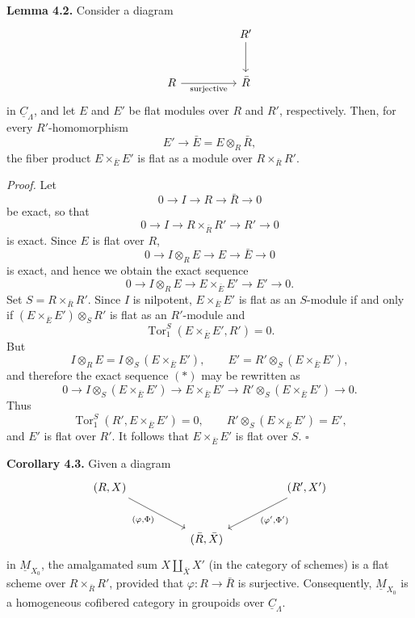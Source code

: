 
\medskip
\noindent\textbf{Lemma 4.2.}
Consider a diagram
\[
\begin{tikzcd}[column sep=huge,row sep=large]
& R' \arrow[d] \\
R \arrow[r,"\mathrm{surjective}"'] & \bar R
\end{tikzcd}
\]
in $\underline C_\Lambda$, and let $E$ and $E'$ be flat modules over
$R$ and $R'$, respectively. Then, for every $R'$-homomorphism
\[
 E'\longrightarrow \bar E=E\otimes_R\bar R,
\]
the fiber product $E\times_{\bar E}E'$ is flat as a module over
$R\times_{\bar R}R'$.


\medskip
\noindent\textit{Proof.}
Let
\[
 0\longrightarrow I\longrightarrow R\longrightarrow\bar R
 \longrightarrow0
\]
be exact, so that
\[
 0\longrightarrow I\longrightarrow R\times_{\bar R}R'
 \longrightarrow R'\longrightarrow0
\]
is exact. Since $E$ is flat over $R$,
\[
 0\longrightarrow I\otimes_RE\longrightarrow E
 \longrightarrow\bar E\longrightarrow0
\]
is exact, and hence we obtain the exact sequence
\begin{equation}\tag{*}
0\longrightarrow I\otimes_RE\longrightarrow
E\times_{\bar E}E'\longrightarrow E'\longrightarrow0.
\end{equation}
Set $S=R\times_{\bar R}R'$. Since $I$ is nilpotent,
$E\times_{\bar E}E'$ is flat as an $S$-module if and only if
$(E\times_{\bar E}E')\otimes_SR'$ is flat as an $R'$-module and
\[
 \operatorname{Tor}_1^S(E\times_{\bar E}E',R')=0.
\]
But
\[
 I\otimes_RE=I\otimes_S(E\times_{\bar E}E'),
 \qquad
 E'=R'\otimes_S(E\times_{\bar E}E'),
\]
and therefore the exact sequence $(*)$ may be rewritten as
\[
0\longrightarrow I\otimes_S(E\times_{\bar E}E')
\longrightarrow E\times_{\bar E}E'
\longrightarrow R'\otimes_S(E\times_{\bar E}E')
\longrightarrow0.
\]
Thus
\[
 \operatorname{Tor}_1^S(R',E\times_{\bar E}E')=0,
 \qquad
 R'\otimes_S(E\times_{\bar E}E')=E',
\]
and $E'$ is flat over $R'$. It follows that
$E\times_{\bar E}E'$ is flat over $S$. \hfill$\square$

\medskip
\noindent\textbf{Corollary 4.3.}
Given a diagram
\[
\begin{tikzcd}[column sep=huge,row sep=large]
(R,X) \arrow[dr,"{(\varphi,\Phi)}"']
&& (R',X') \arrow[dl,"{(\varphi',\Phi')}"] \\
& (\bar R,\bar X) &
\end{tikzcd}
\]
in $\underline M_{X_0}$, the amalgamated sum
$X\amalg_{\bar X}X'$ (in the category of schemes) is a flat scheme
over $R\times_{\bar R}R'$, provided that
$\varphi:R\longrightarrow\bar R$ is surjective. Consequently,
$\underline M_{X_0}$ is a homogeneous cofibered category in groupoids
over $\underline C_\Lambda$.

